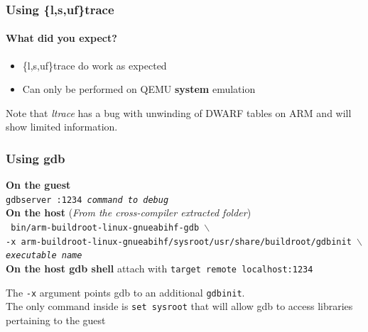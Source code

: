 \begin{frame}
  \frametitle{Using \{l,s,uf\}trace}
  \framesubtitle{What did you expect?}
  \begin{itemize}
    \item \{l,s,uf\}trace do work as expected
    \item Can only be performed on QEMU \textbf{system} emulation
  \end{itemize}
  Note that \textit{ltrace} has a bug with unwinding of DWARF tables on ARM and will show limited information.
\end{frame}
\begin{frame}
  \frametitle{Using gdb}
  \textbf{On the guest} \\
  \texttt{gdbserver :1234 \textit{command to debug}} \\
  \textbf{On the host} (\textit{From the cross-compiler extracted folder}) \\
  \texttt{
    \small
    bin/{\tiny arm-buildroot-linux-gnueabihf-}gdb $\backslash$ \\
      \quad -x {\tiny arm-buildroot-linux-gnueabihf}/sysroot/usr/share/buildroot/gdbinit $\backslash$ \\
      \quad \textit{executable name}
  }\\
  \textbf{On the host gdb shell} attach with \texttt{target remote localhost:1234}
\end{frame}
 {
  The \texttt{-x} argument points gdb to an additional \texttt{gdbinit}. \\
  The only command inside is \texttt{set sysroot} that will allow gdb to access libraries pertaining to the guest
}


